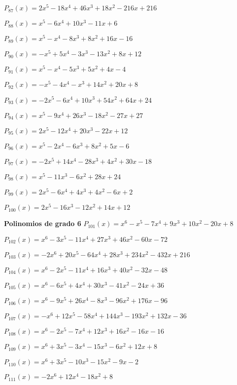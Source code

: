 \subitem $P_{87}(x) = 2x^5 - 18x^4 + 46x^3 + 18x^2 - 216x + 216$

\subitem $P_{88}(x) = x^5 - 6x^4 + 10x^3 - 11x + 6$

\subitem $P_{89}(x) = x^5 - x^4 - 8x^3 + 8x^2 + 16x - 16$

\subitem $P_{90}(x) = -x^5 + 5x^4 - 3x^3 - 13x^2 + 8x + 12$

\subitem $P_{91}(x) = x^5 - x^4 - 5x^3 + 5x^2 + 4x - 4$

\subitem $P_{92}(x) = -x^5 - 4x^4 - x^3 + 14x^2 + 20x + 8$

\subitem $P_{93}(x) = -2x^5 - 6x^4 + 10x^3 + 54x^2 + 64x + 24$

\subitem $P_{94}(x) = x^5 - 9x^4 + 26x^3 - 18x^2 - 27x + 27$

\subitem $P_{95}(x) = 2x^5 - 12x^4 + 20x^3 - 22x + 12$

\subitem $P_{96}(x) = x^5 - 2x^4 - 6x^3 + 8x^2 + 5x - 6$

\subitem $P_{97}(x) = -2x^5 + 14x^4 - 28x^3 + 4x^2 + 30x - 18$

\subitem $P_{98}(x) = x^5 - 11x^3 - 6x^2 + 28x + 24$

\subitem $P_{99}(x) = 2x^5 - 6x^4 + 4x^3 + 4x^2 - 6x + 2$

\subitem $P_{100}(x) = 2x^5 - 16x^3 - 12x^2 + 14x + 12$

\textbf{Polinomios de grado 6} 
\subitem $P_{101}(x) = x^6 - x^5 - 7x^4 + 9x^3 + 10x^2 - 20x + 8$

\subitem $P_{102}(x) = x^6 - 3x^5 - 11x^4 + 27x^3 + 46x^2 - 60x - 72$

\subitem $P_{103}(x) = -2x^6 + 20x^5 - 64x^4 + 28x^3 + 234x^2 - 432x + 216$

\subitem $P_{104}(x) = x^6 - 2x^5 - 11x^4 + 16x^3 + 40x^2 - 32x - 48$

\subitem $P_{105}(x) = x^6 - 6x^5 + 4x^4 + 30x^3 - 41x^2 - 24x + 36$

\subitem $P_{106}(x) = x^6 - 9x^5 + 26x^4 - 8x^3 - 96x^2 + 176x - 96$

\subitem $P_{107}(x) = -x^6 + 12x^5 - 58x^4 + 144x^3 - 193x^2 + 132x - 36$

\subitem $P_{108}(x) = x^6 - 2x^5 - 7x^4 + 12x^3 + 16x^2 - 16x - 16$

\subitem $P_{109}(x) = x^6 + 3x^5 - 3x^4 - 15x^3 - 6x^2 + 12x + 8$

\subitem $P_{110}(x) = x^6 + 3x^5 - 10x^3 - 15x^2 - 9x - 2$

\subitem $P_{111}(x) = -2x^6 + 12x^4 - 18x^2 + 8$

